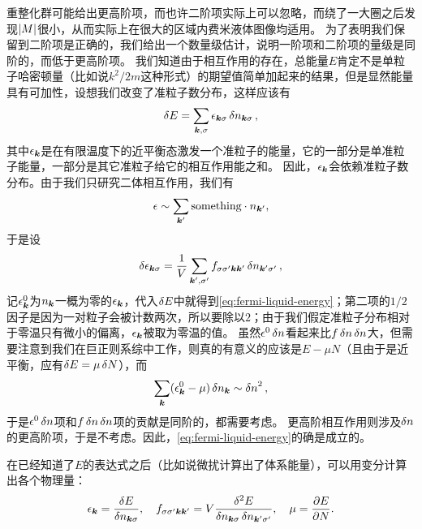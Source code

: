 重整化群可能给出更高阶项，而也许二阶项实际上可以忽略，而绕了一大圈之后发现$\abs{M}$很小，从而实际上在很大的区域内费米液体图像均适用。
为了表明我们保留到二阶项是正确的，我们给出一个数量级估计，说明一阶项和二阶项的量级是同阶的，而低于更高阶项。
我们知道由于相互作用的存在，总能量$E$肯定不是单粒子哈密顿量（比如说$k^2/2m$这种形式）的期望值简单加起来的结果，但是显然能量具有可加性，设想我们改变了准粒子数分布，这样应该有
\[
    \var{E} = \sum_{\vb*{k}, \sigma} \epsilon_{\vb*{k} \sigma} \var{n_{\vb*{k} \sigma}},
\]
其中$\epsilon_{\vb*{k}}$是在有限温度下的近平衡态激发一个准粒子的能量，它的一部分是单准粒子能量，一部分是其它准粒子给它的相互作用能之和。
因此，$\epsilon_{\vb*{k}}$会依赖准粒子数分布。由于我们只研究二体相互作用，我们有
\[
    \epsilon \sim \sum_{\vb*{k}'} \text{something} \cdot n_{\vb*{k}'},
\]
于是设
\[
    \var{\epsilon_{\vb*{k} \sigma}} = \frac{1}{V} \sum_{\vb*{k}', \sigma'} f_{\sigma \sigma' \vb*{k} \vb*{k}'} \var{n_{\vb*{k}' \sigma'}},
\]
记$\epsilon_{\vb*{k}}^0$为$n_{\vb*{k}}$一概为零的$\epsilon_{\vb*{k}}$，代入$\var{E}$中就得到\eqref{eq:fermi-liquid-energy}；第二项的$1/2$因子是因为一对粒子会被计数两次，所以要除以$2$；由于我们假定准粒子分布相对于零温只有微小的偏离，$\epsilon_{\vb*{k}}$被取为零温的值。
虽然$\epsilon^0 \var{n}$看起来比$f\var{n} \var{n}$大，但需要注意到我们在巨正则系综中工作，则真的有意义的应该是$E-\mu N$（且由于是近平衡，应有$\var{E} = \mu \var{N}$），而
\[
    \sum_{\vb*{k}} (\epsilon^0_{\vb*{k}} - \mu) \var{n_{\vb*{k}}} \sim \var{n}^2,
\]
于是$\epsilon^0 \var{n}$项和$f\var{n} \var{n}$项的贡献是同阶的，都需要考虑。
更高阶相互作用则涉及$\var{n}$的更高阶项，于是不考虑。因此，\eqref{eq:fermi-liquid-energy}的确是成立的。

在已经知道了$E$的表达式之后（比如说微扰计算出了体系能量），可以用变分计算出各个物理量：
\begin{equation}
    \epsilon_{\vb*{k}} = \fdv{E}{n_{\vb*{k} \sigma}} , \quad f_{\sigma \sigma' \vb*{k} \vb*{k}'} = V \frac{\var[2]{E}}{\var{n_{\vb*{k} \sigma}}\var{n_{\vb*{k}' \sigma'}}}, \quad \mu = \pdv{E}{N}.
\end{equation}

